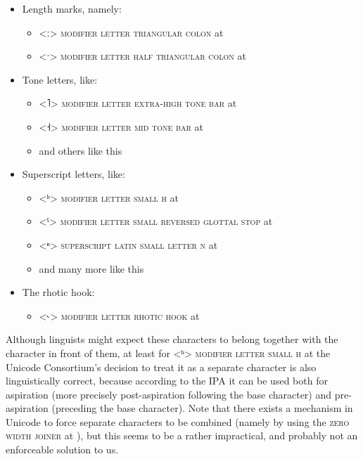 \begin{itemize}
  
	\item[] Length marks, namely: 
	\begin{itemize}
	  \item[] <ː> \textsc{modifier letter triangular colon} at 
	  \item[] <ˑ> \textsc{modifier letter half triangular colon} at 
	\end{itemize}
	 
	\item[] Tone letters, like: 
	\begin{itemize} 
	  \item[] <˥> \textsc{modifier letter extra-high tone bar} at 
	  \item[] <˧> \textsc{modifier letter mid tone bar} at 
	  \item[] and others like this
	\end{itemize}
	
	\item[] Superscript letters, like:
	\begin{itemize}
	  \item[] <ʰ> \textsc{modifier letter small h} at 
	  \item[] <ˤ> \textsc{modifier letter small reversed glottal stop} at 
	  \item[] <ⁿ> \textsc{superscript latin small letter n} at 
	  \item[] and many more like this
	\end{itemize}
	
	\item[] The rhotic hook:
	\begin{itemize}
	  \item[] <˞> \textsc{modifier letter rhotic hook} at 
	\end{itemize}
	
\end{itemize}

Although linguists might expect these characters to belong together with the
character in front of them, at least for <ʰ> \textsc{modifier letter small h} at
 the Unicode Consortium's decision to treat it as a separate character
is also linguistically correct, because according to the IPA it can be used both
for aspiration (more precisely post-aspiration following the base character) and
pre-aspiration (preceding the base character). Note that there exists a mechanism in
Unicode to force separate characters to be combined (namely by using the
\textsc{zero width joiner} at ), but this seems to be a rather
impractical, and probably not an enforceable solution to us.

